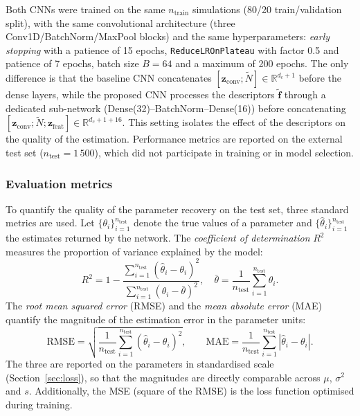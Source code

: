 \documentclass[a4paper,fleqn]{cas-sc}
\numberwithin{equation}{section}
\begin{document}
Both CNNs were trained on the same $n_{\mathrm{train}}$ simulations
(80/20 train/validation split), with the same convolutional
architecture (three Conv1D/BatchNorm/MaxPool blocks) and the same
hyperparameters: \textit{early stopping} with a patience of 15 epochs,
\texttt{ReduceLROnPlateau} with factor 0.5 and patience of 7 epochs,
batch size $B=64$ and a maximum of 200 epochs. The only difference is
that the baseline CNN concatenates
$[\mathbf{z}_{\mathrm{conv}};\tilde{N}]\in\mathbb{R}^{d_c+1}$ before
the dense layers, while the proposed CNN processes the descriptors
$\tilde{\mathbf{f}}$ through a dedicated sub-network
(Dense(32)--BatchNorm--Dense(16)) before concatenating
$[\mathbf{z}_{\mathrm{conv}};\tilde{N};
\mathbf{z}_{\mathrm{feat}}]\in\mathbb{R}^{d_c+1+16}$. This setting
isolates the effect of the descriptors on the quality of the
estimation. Performance metrics are reported on the external test set
($n_{\mathrm{test}}=1\,500$), which did not participate in training or
in model selection.

\subsubsection{Evaluation metrics}
\label{sec:metrics}

To quantify the quality of the parameter recovery on the test set,
three standard metrics are used. Let
$\{\theta_i\}_{i=1}^{n_{\mathrm{test}}}$ denote the true values of a
parameter and $\{\hat{\theta}_i\}_{i=1}^{n_{\mathrm{test}}}$ the
estimates returned by the network. The \emph{coefficient of
determination} $R^2$ measures the proportion of variance explained by
the model:
\begin{equation}
    R^2 = 1 - \frac{\sum_{i=1}^{n_{\mathrm{test}}}
    (\hat{\theta}_i - \theta_i)^2}
    {\sum_{i=1}^{n_{\mathrm{test}}}(\theta_i - \bar{\theta})^2},
    \quad \bar{\theta} = \frac{1}{n_{\mathrm{test}}}
    \sum_{i=1}^{n_{\mathrm{test}}}\theta_i.
    \label{eq:r2}
\end{equation}
The \emph{root mean squared error} (RMSE) and the \emph{mean absolute
error} (MAE) quantify the magnitude of the estimation error in the
parameter units:
\begin{equation}
    \mathrm{RMSE} = \sqrt{\frac{1}{n_{\mathrm{test}}}
    \sum_{i=1}^{n_{\mathrm{test}}}(\hat{\theta}_i - \theta_i)^2},
    \qquad
    \mathrm{MAE} = \frac{1}{n_{\mathrm{test}}}
    \sum_{i=1}^{n_{\mathrm{test}}}|\hat{\theta}_i - \theta_i|.
    \label{eq:rmse_mae}
\end{equation}
The three are reported on the parameters in standardised scale
(Section~\ref{sec:loss}), so that the magnitudes are directly
comparable across $\mu$, $\sigma^2$ and $s$. Additionally, the MSE
(square of the RMSE) is the loss function optimised during training.
\end{document}
